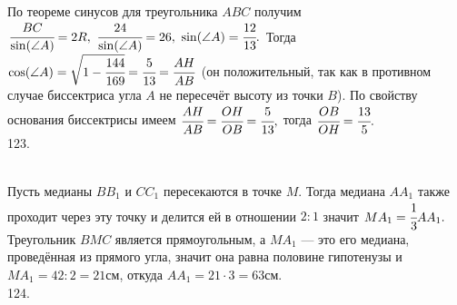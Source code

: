 \documentclass[12pt]{article}
\begin{document}
По теореме синусов для треугольника $ABC$ получим $\cfrac{BC}{\sin(\angle A)}=2R,\ \cfrac{24}{\sin(\angle A)}=26,\ \sin(\angle A)=\cfrac{12}{13}.$
Тогда $\cos(\angle A)=\sqrt{1-\cfrac{144}{169}}=\cfrac{5}{13}=\cfrac{AH}{AB}$ (он положительный, так как в противном случае биссектриса угла $A$ не пересечёт высоту из точки $B$). По свойству основания биссектрисы имеем $\cfrac{AH}{AB}=\cfrac{OH}{OB}=\cfrac{5}{13},$ тогда $\cfrac{OB}{OH}=\cfrac{13}{5}.$\\
123. \begin{figure}[ht!]
\end{figure}\\
Пусть медианы $BB_1$ и $CC_1$ пересекаются в точке $M.$ Тогда медиана $AA_1$ также проходит через эту точку и делится ей в отношении $2:1$ значит $MA_1=\cfrac{1}{3}AA_1.$ Треугольник $BMC$ является прямоугольным, а $MA_1$ --- это его медиана, проведённая из прямого угла, значит она равна половине гипотенузы и $MA_1=42:2=21$см, откуда $AA_1=21\cdot3=63$см.\\
124. \begin{figure}[ht!]
\end{figure}\\
\end{document}
